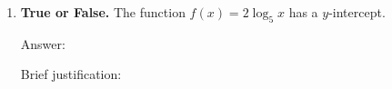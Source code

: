 \documentclass[10pt]{article}
\begin{document}
\begin{enumerate}[leftmargin=1.8em, itemsep=14pt]
\begin{teachernote}
$x = -3$ and $x = 0$ are invalid: the domain of a logarithm is $x > 0$.
$x = 1/9$, $x = 1$, and $x = 27$ are all positive, so they are valid inputs.
\end{teachernote}

\vspace{6pt}

\item \textbf{True or False.} The function $f(x) = 2\log_5 x$ has a $y$-intercept.

\vspace{4pt}
Answer: 

\vspace{4pt}
Brief justification: 

\end{enumerate}
\end{document}
